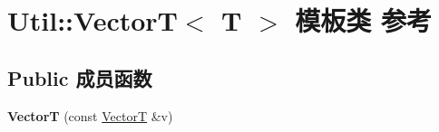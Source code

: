 \hypertarget{class_util_1_1_vector_t}{\section{Util\-:\-:Vector\-T$<$ T $>$ 模板类 参考}
\label{class_util_1_1_vector_t}
}
\subsection*{Public 成员函数}
\begin{DoxyCompactItemize}
\item 
\hypertarget{class_util_1_1_vector_t_a68272ba6470b7956515da804e7156702}{{\bfseries Vector\-T} (const \hyperlink{class_util_1_1_vector_t}{Vector\-T} \&v)}\label{class_util_1_1_vector_t_a68272ba6470b7956515da804e7156702}


\end{DoxyCompactItemize}
